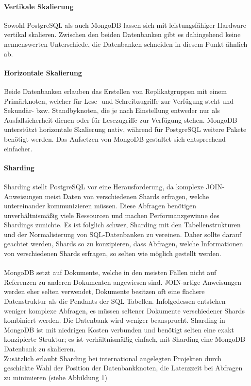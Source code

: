 \paragraph{Vertikale Skalierung\\}
Sowohl PostgreSQL als auch MongoDB lassen sich mit leistungsfähiger Hardware vertikal skalieren.
Zwischen den beiden Datenbanken gibt es dahingehend keine nennenswerten Unterschiede, die Datenbanken schneiden in diesem Punkt ähnlich ab.

\paragraph{Horizontale Skalierung\\}
Beide Datenbanken erlauben das Erstellen von Replikatgruppen mit einem Primärknoten, welcher für Lese- und Schreibzugriffe zur Verfügung steht und Sekundär- bzw. Standbyknoten, die je nach Einstellung entweder nur als Ausfallsicherheit dienen oder für Lesezugriffe zur Verfügung stehen.
MongoDB unterstützt horizontale Skalierung nativ, während für PostgreSQL weitere Pakete benötigt werden. \cite{MG8}
Das Aufsetzen von MongoDB gestaltet sich entsprechend einfacher.

\paragraph{Sharding\\}
\paragraph{}
Sharding stellt PostgreSQL vor eine Herausforderung, da komplexe JOIN-Anweisungen meist Daten von verschiedenen Shards erfragen, welche untereinander kommunizieren müssen.
Diese Abfragen benötigen unverhältnismäßig viele Ressourcen und machen Performanzgewinne des Shardings zunichte. %
Es ist folglich schwer, Sharding mit den Tabellenstrukturen und der Normalisierung von SQL-Datenbanken zu vereinen.
Daher sollte darauf geachtet werden, Shards so zu konzipieren, dass Abfragen, welche Informationen von verschiedenen Shards erfragen, so selten wie möglich gestellt werden.

\paragraph{}
MongoDB setzt auf Dokumente, welche in den meisten Fällen nicht auf Referenzen zu anderen Dokumenten angewiesen sind.
JOIN-artige Anweisungen werden eher selten verwendet, Dokumente besitzen oft eine flachere Datenstruktur als die Pendants der SQL-Tabellen.
Infolgedessen entstehen weniger komplexe Abfragen, es müssen seltener Dokumente verschiedener Shards kombiniert werden.
Die Datenbank wird weniger beansprucht.
Sharding in MongoDB ist mit niedrigen Kosten verbunden und benötigt selten eine exakt konzipierte Struktur; es ist verhältnismäßig einfach, mit Sharding eine MongoDB Datenbank zu skalieren.\\
Zusätzlich erlaubt Sharding bei international angelegten Projekten durch geschickte Wahl der Position der Datenbankknoten, die Latenzzeit bei Abfragen zu minimieren (siehe Abbildung 1) %

